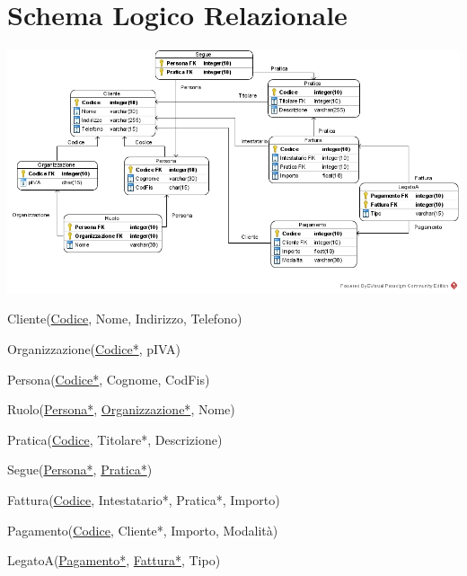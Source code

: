 \documentclass[10pt]{article}
\begin{document}
\section{Schema Logico Relazionale}
\begin{center}
	\includegraphics[scale=0.5]{LogicoRelazionale.jpg}
\end{center}
\begin{list}{}{\textbf{Notazione testuale}}
	\item Cliente(\underline{Codice}, Nome, Indirizzo, Telefono)
	\item Organizzazione(\underline{Codice*}, pIVA)
	\item Persona(\underline{Codice*}, Cognome, CodFis)
	\item Ruolo(\underline{Persona*}, \underline{Organizzazione*}, Nome)
	\item Pratica(\underline{Codice}, Titolare*, Descrizione)
	\item Segue(\underline{Persona*}, \underline{Pratica*})
	\item Fattura(\underline{Codice}, Intestatario*, Pratica*, Importo)
	\item Pagamento(\underline{Codice}, Cliente*, Importo, Modalità)
	\item LegatoA(\underline{Pagamento*}, \underline{Fattura*}, Tipo)
\end{list}
\pagebreak
\end{document}
